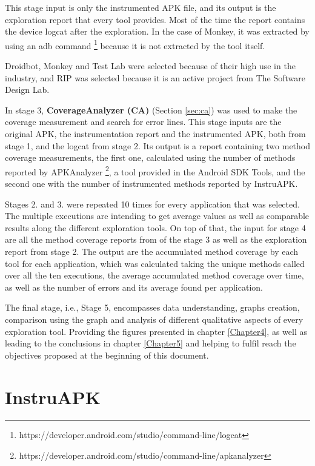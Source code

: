 This stage input is only the instrumented APK file, and its output is the exploration report that every tool provides. Most of the time the report contains the device logcat after the exploration. In the case of Monkey, it was extracted by using an adb command \footnote{https://developer.android.com/studio/command-line/logcat} because it is not extracted by the tool itself.

Droidbot, Monkey and Test Lab were selected because of their high use in the industry, and RIP was selected because it is an active project from The Software Design Lab. 

In stage 3, \textbf{CoverageAnalyzer (CA)} (Section \ref{sec:ca}) was used to make the coverage measurement and search for error lines. This stage inputs are the original APK, the instrumentation report and the instrumented APK, both from stage 1, and the logcat from stage 2. Its output is a report containing two method coverage measurements, the first one, calculated using the number of methods reported by APKAnalyzer \footnote{https://developer.android.com/studio/command-line/apkanalyzer}, a tool provided in the Android SDK Tools, and the second one with the number of instrumented methods reported by InstruAPK.

Stages 2. and 3. were repeated 10 times for every application that was selected. The multiple executions are intending to get average values as well as comparable results along the different exploration tools. On top of that, the input for stage 4 are all the method coverage reports from of the stage 3 as well as the exploration report from stage 2. The output are the accumulated method coverage by each tool for each application, which was calculated taking the unique methods called over all the ten executions, the average accumulated method coverage over time, as well as the number of errors and its average found per application.

The final stage, i.e.,  Stage 5,  encompasses data understanding, graphs creation, comparison using the graph and analysis of different qualitative aspects of every exploration tool. Providing the figures presented in chapter \ref{Chapter4}, as well as leading to the conclusions in chapter \ref{Chapter5} and helping to fulfil reach the objectives proposed at the beginning of this document.



\section{InstruAPK}\label{sec:instruAPK}

